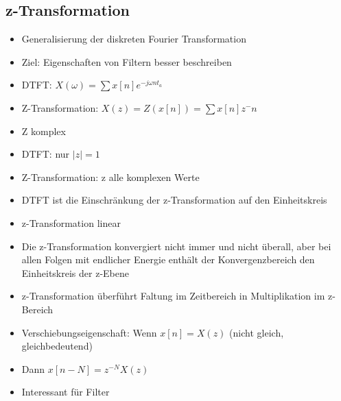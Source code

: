 \documentclass[a4paper,10pt,oneside]{article}
\begin{document}
\subsection{z-Transformation}
\begin{itemize}
	\item Generalisierung der diskreten Fourier Transformation
	\item Ziel: Eigenschaften von Filtern besser beschreiben
	\item DTFT: $X(\omega) = \sum x[n]e^{-j\omega nt_a}$
	\item Z-Transformation: $X(z) = Z(x[n]) = \sum x[n] z^-n$
	\item Z komplex
	\item DTFT: nur $|z| = 1$
	\item Z-Transformation: z alle komplexen Werte
	\item DTFT ist die Einschränkung der z-Transformation auf den Einheitskreis
	\item z-Transformation linear
	\item Die z-Transformation konvergiert nicht immer und nicht überall, aber bei allen Folgen mit endlicher Energie enthält der Konvergenzbereich den Einheitskreis der z-Ebene
	\item z-Transformation überführt Faltung im Zeitbereich in Multiplikation im z-Bereich
	\item Verschiebungseigenschaft: Wenn $x[n] = X(z)$ (nicht gleich, gleichbedeutend)
	\item Dann $x[n-N] = z^{-N}X(z)$
	\item Interessant für Filter
\end{itemize}
\end{document}
